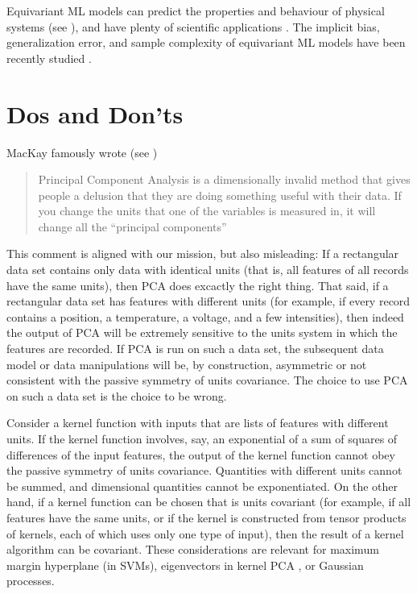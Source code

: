 \documentclass[preprint]{article} %
\begin{document}
Equivariant ML models can predict the properties and behaviour of physical systems (see \citealt{cheng2019covariance}), and have plenty of scientific applications \citep{batzner20223, musaelian2022learning, stark2022equibind, yu-physics, wang2022approximately}. The implicit bias, generalization error, and sample complexity of equivariant ML models have been recently studied \citep{lawrence2021implicit, bietti2021sample, elesedy2021provably, elesedy2021kernel, mei2021learning}.

\section{Dos and Don'ts}\label{sec:dos}
MacKay famously wrote (see \citealt{muldoonmedium})
\begin{quote}Principal Component Analysis is a dimensionally invalid method that gives people a delusion that they are doing something useful with their data. If you change the units that one of the variables is measured in, it will change all the ``principal components''\end{quote}
This comment is aligned with our mission, but also misleading: If a rectangular data set contains only data with identical units (that is, all features of all records have the same units), then PCA does excactly the right thing.
That said, if a rectangular data set has features with different units (for example, if every record contains a position, a temperature, a voltage, and a few intensities), then indeed the output of PCA will be extremely sensitive to the units system in which the features are recorded.
If PCA is run on such a data set, the subsequent data model or data manipulations will be, by construction, asymmetric or not consistent with the passive symmetry of units covariance.
The choice to use PCA on such a data set is the choice to be wrong.

Consider a kernel function with inputs that are lists of features with different units.
If the kernel function involves, say, an exponential of a sum of squares of differences of the input features, the output of the kernel function cannot obey the passive symmetry of units covariance.
Quantities with different units cannot be summed, and dimensional quantities cannot be exponentiated. 
On the other hand, if a kernel function can be chosen that is units covariant (for example, if all features have the same units, or if the kernel is constructed from tensor products of kernels, each of which uses only one type of input), then the result of a kernel algorithm can be covariant. These considerations are relevant for maximum margin hyperplane (in SVMs), eigenvectors in kernel PCA \citep{SchSmo02}, or Gaussian processes.
\end{document}
